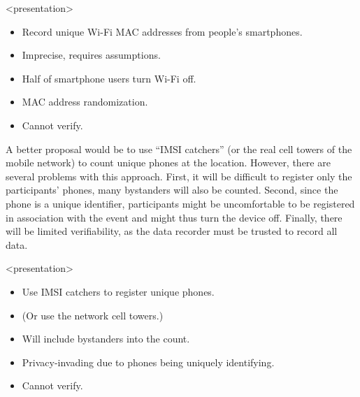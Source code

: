 \begin{frame}<presentation>
  \begin{solution}[Wi-Fi tracking]
    \begin{itemize}
      \item Record unique Wi-Fi MAC addresses from people's smartphones.
    \end{itemize}
  \end{solution}

  \pause

  \begin{remark}
    \begin{itemize}
      \item Imprecise, requires assumptions.
      \item Half of smartphone users turn Wi-Fi off.
      \item MAC address randomization.
      \item Cannot verify.
    \end{itemize}
  \end{remark}
\end{frame}

A better proposal would be to use \enquote{IMSI catchers} (or the real cell 
towers of the mobile network) to count unique phones at the location.
However, there are several problems with this approach.
First, it will be difficult to register only the participants' phones, many 
bystanders will also be counted.
Second, since the phone is a unique identifier, participants might be 
uncomfortable to be registered in association with the event and might thus 
turn the device off.
Finally, there will be limited verifiability, as the data recorder must be 
trusted to record all data.

\begin{frame}<presentation>
  \begin{solution}
    \begin{itemize}
      \item Use IMSI catchers to register unique phones.
      \item (Or use the network cell towers.)
    \end{itemize}
  \end{solution}

  \pause

  \begin{remark}
    \begin{itemize}
      \item Will include bystanders into the count.
      \item Privacy-invading due to phones being uniquely identifying.
      \item Cannot verify.
    \end{itemize}
  \end{remark}
\end{frame}

